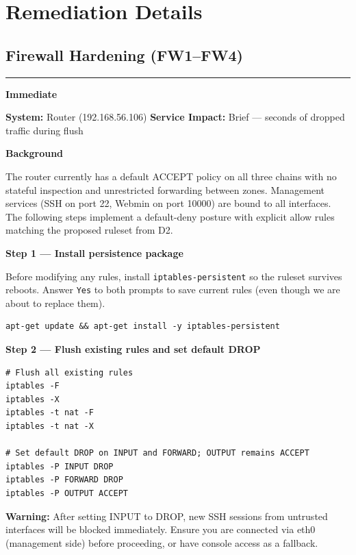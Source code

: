 \documentclass[12pt]{article}
\newcommand{\tfbadge}[2]{%
  \colorbox{#1}{\color{white}\textbf{\small #2}}%
}
\newcommand{\sectionrule}{%
  \vspace{4pt}\noindent\textcolor{headercol}{\rule{\linewidth}{0.8pt}}\vspace{4pt}%
}
\begin{document}
\section{Remediation Details}
\subsection{Firewall Hardening (FW1--FW4)}
\sectionrule
 
\noindent\tfbadge{immediatecol}{Immediate}
\quad\textbf{System:} Router (192.168.56.106)
\quad\textbf{Service Impact:} Brief --- seconds of dropped traffic during flush
 
\bigskip
\noindent\textbf{Background}
 
The router currently has a default ACCEPT policy on all three chains with no
stateful inspection and unrestricted forwarding between zones. Management
services (SSH on port 22, Webmin on port 10000) are bound to all interfaces.
The following steps implement a default-deny posture with explicit allow rules
matching the proposed ruleset from D2.
 
\bigskip
\noindent\textbf{Step 1 --- Install persistence package}
 
Before modifying any rules, install \texttt{iptables-persistent} so the
ruleset survives reboots. Answer \texttt{Yes} to both prompts to save current
rules (even though we are about to replace them).
 
\begin{lstlisting}[style=terminal]
apt-get update && apt-get install -y iptables-persistent
\end{lstlisting}
 
\newpage
\noindent\textbf{Step 2 --- Flush existing rules and set default DROP}
 
\begin{lstlisting}[style=terminal]
# Flush all existing rules
iptables -F
iptables -X
iptables -t nat -F
iptables -t nat -X
 
# Set default DROP on INPUT and FORWARD; OUTPUT remains ACCEPT
iptables -P INPUT DROP
iptables -P FORWARD DROP
iptables -P OUTPUT ACCEPT
\end{lstlisting}
 
\begin{warnbox}
\textbf{Warning:} After setting INPUT to DROP, new SSH sessions from untrusted
interfaces will be blocked immediately. Ensure you are connected via eth0
(management side) before proceeding, or have console access as a fallback.
\end{warnbox}
 
\end{document}
